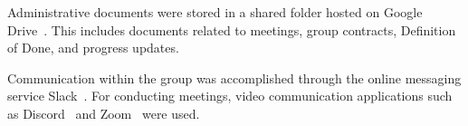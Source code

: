 Administrative documents were stored in a shared folder hosted on Google Drive~\cite{google_drive}.
This includes documents related to meetings, group contracts, Definition of Done, and progress updates.

Communication within the group was accomplished through the online messaging service Slack~\cite{slack}.
For conducting meetings, video communication applications such as Discord~\cite{discord} and Zoom~\cite{zoom} were used.